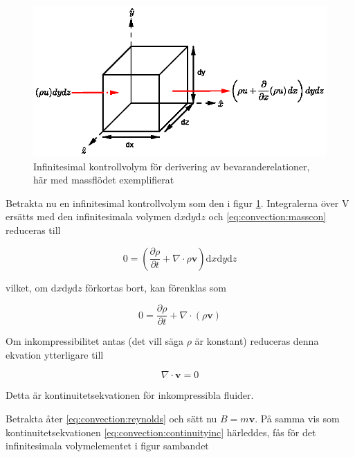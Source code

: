 \begin{figure}[hpbt]\centering
\includegraphics[scale=1]{images/massflowcube.eps}
\caption{Infinitesimal kontrollvolym för derivering av bevaranderelationer, här med massflödet exemplifierat}
\label{fig:massflowcube}
\end{figure}

Betrakta nu en infinitesimal kontrollvolym som den i figur \ref{fig:massflowcube}. Integralerna över V ersätts med den infinitesimala volymen $\mathrm{d}x\mathrm{d}y\mathrm{d}z$ och \eqref{eq:convection:masscon} reduceras till

\begin{equation}
\label{eq:convection:massconinf}
0 = \left( \frac{\partial \rho}{\partial t} + \nabla \cdot \rho \mathbf{v}\right) \mathrm{d}x\mathrm{d}y\mathrm{d}z
\end{equation}

vilket, om $\mathrm{d}x\mathrm{d}y\mathrm{d}z$ förkortas bort, kan förenklas som

\begin{equation}
\label{eq:convection:continuity}
\boxed{ \; \; \;
0 = \frac{\partial \rho}{\partial t} + \nabla \cdot \left( \rho \mathbf{v} \right) 
\; \; \; }
\end{equation}

Om inkompressibilitet antas (det vill säga $\rho$ är konstant) reduceras denna ekvation ytterligare till

\begin{equation}
\label{eq:convection:continuityinc}
\nabla \cdot \mathbf{v} = 0
\end{equation}

Detta är kontinuitetsekvationen för inkompressibla fluider.

Betrakta åter \eqref{eq:convection:reynolds} och sätt nu $B = m\mathbf{v}$. På samma vis som kontinuitetsekvationen \eqref{eq:convection:continuityinc} härleddes, fås för det infinitesimala volymelementet i figur sambandet

